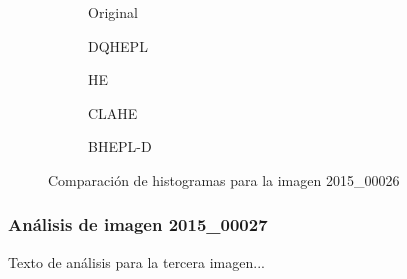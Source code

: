 \documentclass[sigchi]{acmart}
\begin{document}
\begin{figure}[H]
    \centering
    \begin{subfigure}[b]{0.45\textwidth}
        \resizebox{\linewidth}{!}{}
        \caption{Original}
        \label{fig:original_2}
    \end{subfigure}
    \hfill
    \begin{subfigure}[b]{0.45\textwidth}
        \resizebox{\linewidth}{!}{}
        \caption{DQHEPL}
        \label{fig:dqhepl_2}
    \end{subfigure}
    
    \vspace{5mm}
    
    \begin{subfigure}[b]{0.45\textwidth}
        \resizebox{\linewidth}{!}{}
        \caption{HE}
        \label{fig:he_2}
    \end{subfigure}
    \hfill
    \begin{subfigure}[b]{0.45\textwidth}
        \resizebox{\linewidth}{!}{}
        \caption{CLAHE}
        \label{fig:clahe_2}
    \end{subfigure}
    
    \vspace{5mm}
    
    \centering
    \begin{subfigure}[b]{0.45\textwidth}
        \resizebox{\linewidth}{!}{}
        \caption{BHEPL-D}
        \label{fig:bhepl_2}
    \end{subfigure}
    
    \caption{Comparación de histogramas para la imagen 2015\_00026}
    \label{fig:histogramas_2}
\end{figure}

\subsubsection{Análisis de imagen 2015\_00027}

Texto de análisis para la tercera imagen...
\end{document}
